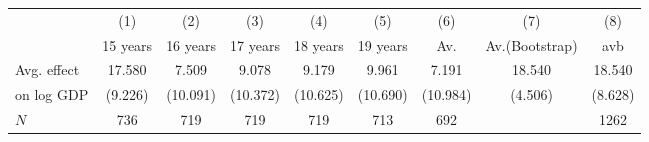 \begin{tabular}{l*{8}{c}}
\hline\hline
            &\multicolumn{1}{c}{(1)}&\multicolumn{1}{c}{(2)}&\multicolumn{1}{c}{(3)}&\multicolumn{1}{c}{(4)}&\multicolumn{1}{c}{(5)}&\multicolumn{1}{c}{(6)}&\multicolumn{1}{c}{(7)}&\multicolumn{1}{c}{(8)}\\
            &    15 years&    16 years&    17 years&    18 years&    19 years&         Av.&Av.(Bootstrap)&         avb\\
\hline
Avg. effect &      17.580&       7.509&       9.078&       9.179&       9.961&       7.191&      18.540&      18.540\\
on log GDP  &     (9.226)&    (10.091)&    (10.372)&    (10.625)&    (10.690)&    (10.984)&     (4.506)&     (8.628)\\
\hline
\(N\)       &         736&         719&         719&         719&         713&         692&            &        1262\\
\hline\hline
\end{tabular}
